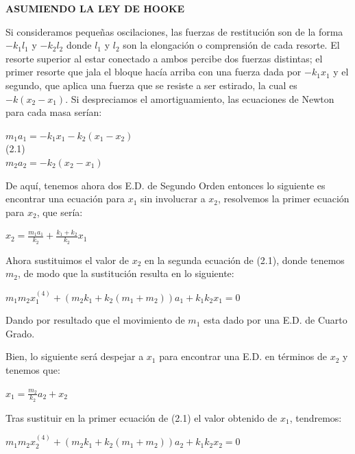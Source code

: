 \begin{center}
	\textbf{ASUMIENDO LA LEY DE HOOKE}
\end{center}


\noindent Si consideramos pequeñas oscilaciones, las fuerzas de restitución son de la forma $-k_1l_1$ y $-k_2l_2$ donde $l_1$ y $l_2$ son la elongación  o comprensión de cada resorte. El resorte superior al estar conectado a ambos percibe dos fuerzas distintas; el primer resorte que jala el bloque hacía arriba con una fuerza dada por $-k_1x_1$ y el segundo, que aplica una fuerza que se resiste a ser estirado, la cual es $-k(x_2-x_1)$. Si despreciamos el amortiguamiento, las ecuaciones de Newton para cada masa serían:

\begin{center}
$m_1a_1 = -k_1x_1 - k_2(x_1 - x_2)$ 
\\ \hspace{12 cm} (2.1)
\\ $m_2a_2 = -k_2(x_2 - x_1)$
\end{center}

De aquí, tenemos ahora dos E.D. de Segundo Orden entonces lo siguiente es encontrar una ecuación para $x_1$ sin involucrar a $x_2$, resolvemos la primer ecuación para $x_2$, que sería:

\begin{center}
	$x_2 = \frac{m_1a_1}{k_2} + \frac{k_1 + k_2}{k_2}x_1$
\end{center}

Ahora sustituimos el valor de $x_2$ en la segunda ecuación de (2.1), donde tenemos $m_2$, de modo que la sustitución resulta en lo siguiente:

\begin{center}
	$m_1m_2x_1^{(4)} + (m_2k_1 + k_2(m_1 + m_2))a_1 + k_1k_2x_1  = 0$
\end{center}

Dando por resultado que el movimiento de $m_1$ esta dado por una E.D. de Cuarto Grado. 

Bien, lo siguiente será despejar a $x_1$ para encontrar una E.D. en términos de $x_2$ y tenemos que:

\begin{center}
	$x_1 = \frac{m_2}{k_2}a_2 + x_2$
\end{center}

Tras sustituir en la primer ecuación de (2.1) el valor obtenido de $x_1$, tendremos:

\begin{center}
	$m_1m_2x_2^{(4)} + (m_2k_1 + k_2(m_1 + m_2))a_2 + k_1k_2x_2 = 0$
\end{center}

